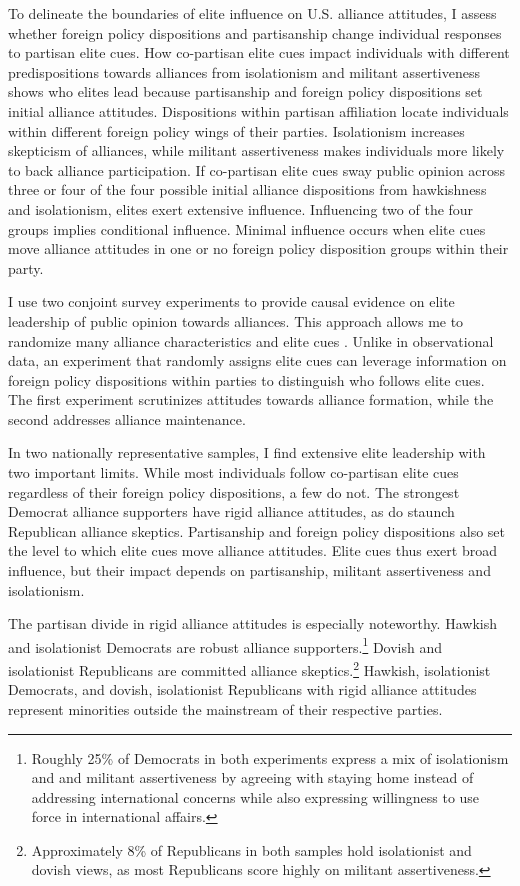 \documentclass[12pt]{article}
\begin{document}
To delineate the boundaries of elite influence on U.S. alliance attitudes, I assess whether foreign policy dispositions and partisanship change individual responses to partisan elite cues.
How co-partisan elite cues impact individuals with different predispositions towards alliances from isolationism and militant assertiveness shows who elites lead because partisanship and foreign policy dispositions set initial alliance attitudes. 
Dispositions within partisan affiliation locate individuals within different foreign policy wings of their parties. 
Isolationism increases skepticism of alliances, while militant assertiveness makes individuals more likely to back alliance participation. 
If co-partisan elite cues sway public opinion across three or four of the four possible initial alliance dispositions from hawkishness and isolationism, elites exert extensive influence. 
Influencing two of the four groups implies conditional influence. 
Minimal influence occurs when elite cues move alliance attitudes in one or no foreign policy disposition groups within their party.


I use two conjoint survey experiments to provide causal evidence on elite leadership of public opinion towards alliances.
This approach allows me to randomize many alliance characteristics and elite cues \citep{Hainmuelleretal2014}.
Unlike in observational data, an experiment that randomly assigns elite cues can leverage information on foreign policy dispositions within parties to distinguish who follows elite cues. 
The first experiment scrutinizes attitudes towards alliance formation, while the second addresses alliance maintenance. 


In two nationally representative samples, I find extensive elite leadership with two important limits.
While most individuals follow co-partisan elite cues regardless of their foreign policy dispositions, a few do not.
The strongest Democrat alliance supporters have rigid alliance attitudes, as do staunch Republican alliance skeptics. 
Partisanship and foreign policy dispositions also set the level to which elite cues move alliance attitudes.
Elite cues thus exert broad influence, but their impact depends on partisanship, militant assertiveness and isolationism.


The partisan divide in rigid alliance attitudes is especially noteworthy.
Hawkish and isolationist Democrats are robust alliance supporters.\footnote{Roughly 25\% of Democrats in both experiments express a mix of isolationism and and militant assertiveness by agreeing with staying home instead of addressing international concerns while also expressing willingness to use force in international affairs.}
Dovish and isolationist Republicans are committed alliance skeptics.\footnote{Approximately 8\% of Republicans in both samples hold isolationist and dovish views, as most Republicans score highly on militant assertiveness.} 
Hawkish, isolationist Democrats, and dovish, isolationist Republicans with rigid alliance attitudes represent minorities outside the mainstream of their respective parties. 
\end{document}

